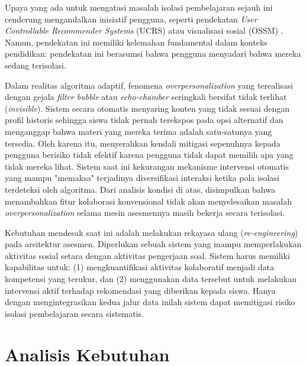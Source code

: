 Upaya yang ada untuk mengatasi masalah isolasi pembelajaran sejauh ini cenderung mengandalkan inisiatif pengguna, seperti pendekatan \textit{User Controllable Recommender Systems} (UCRS) \autocite{Wang2022} atau visualisasi sosial (OSSM) \autocite{Brusilovsky2016}. Namun, pendekatan ini memiliki kelemahan fundamental dalam konteks pendidikan: pendekatan ini berasumsi bahwa pengguna menyadari bahwa mereka sedang terisolasi.

Dalam realitas algoritma adaptif, fenomena \textit{overpersonalization} yang terealisasi dengan gejala \textit{filter bubble} atau \textit{echo-chamber} seringkali bersifat tidak terlihat (\textit{invisible}). Sistem secara otomatis menyaring konten yang tidak sesuai dengan profil historis sehingga siswa tidak pernah terekspos pada opsi alternatif dan menganggap bahwa materi yang mereka terima adalah satu-satunya yang tersedia. Oleh karena itu, menyerahkan kendali mitigasi sepenuhnya kepada pengguna berisiko tidak efektif karena pengguna tidak dapat memilih apa yang tidak mereka lihat. Sistem saat ini kekurangan mekanisme intervensi otomatis yang mampu "memaksa" terjadinya diversifikasi interaksi ketika pola isolasi terdeteksi oleh algoritma.
Dari analisis kondisi di atas, disimpulkan bahwa menambahkan fitur kolaborasi konvensional tidak akan menyelesaikan masalah \textit{overpersonalization} selama mesin asesmennya masih bekerja secara terisolasi.

Kebutuhan mendesak saat ini adalah melakukan rekayasa ulang (\textit{re-engineering}) pada arsitektur asesmen. Diperlukan sebuah sistem yang mampu memperlakukan aktivitas sosial setara dengan aktivitas pengerjaan soal. Sistem harus memiliki kapabilitas untuk: (1) mengkuantifikasi aktivitas kolaboratif menjadi data kompetensi yang terukur, dan (2) menggunakan data tersebut untuk melakukan intervensi aktif terhadap rekomendasi yang diberikan kepada siswa. Hanya dengan mengintegrasikan kedua jalur data inilah sistem dapat memitigasi risiko isolasi pembelajaran secara sistematis.

\section{Analisis Kebutuhan}
\label{sec:analisis_kebutuhan}

